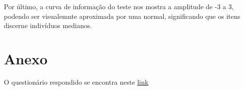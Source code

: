 \documentclass[]{article}
\begin{document}
Por último, a curva de informação do teste nos mostra a amplitude de -3
a 3, podendo ser visualemnte aproximada por uma normal, significando que
os itens discerne indivíduos medianos.

\hypertarget{Anexo}{\section{Anexo}\label{Anexo}}

O questionário respondido se encontra neste
\href{https://github.com/Andryas/CE095/raw/master/bookdown/questionario.pdf}{link}


\end{document}
